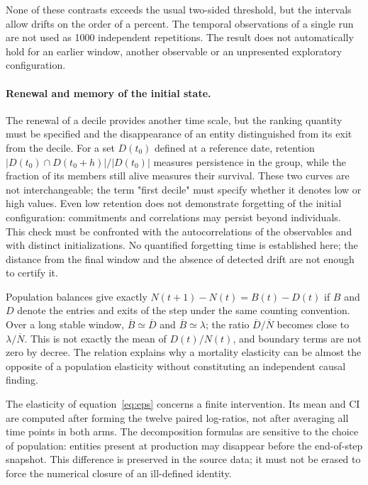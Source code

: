 

None of these contrasts exceeds the usual two-sided threshold, but the
intervals allow drifts on the order of a percent. The temporal observations
of a single run are not used as 1000 independent repetitions.
The result does not automatically hold for an earlier window,
another observable or an unpresented exploratory configuration.

\paragraph{Renewal and memory of the initial state.}
The renewal of a decile provides another time scale, but
the ranking quantity must be specified and the disappearance of an
entity distinguished from its exit from the decile. For a set $D(t_0)$
defined at a reference date, retention
$|D(t_0)\cap D(t_0+h)|/|D(t_0)|$ measures persistence in the group,
while the fraction of its members still alive measures their survival.
These two curves are not interchangeable; the term "first
decile" must specify whether it denotes low or high values.
Even low retention does not demonstrate forgetting of the
initial configuration: commitments and correlations may persist beyond
individuals. This check must be confronted with the autocorrelations of
the observables and with distinct initializations. No quantified
forgetting time is established here; the distance from the final window and
the absence of detected drift are not enough to certify it.

Population balances give exactly
$N(t+1)-N(t)=B(t)-D(t)$ if $B$ and $D$ denote the entries and exits
of the step under the same counting convention. Over a long stable window,
$\overline B\simeq\overline D$ and $\overline B\simeq\lambda$;
the ratio $\overline D/\overline N$ becomes close to
$\lambda/\overline N$. This is not exactly the mean of
$D(t)/N(t)$, and boundary terms are not zero by decree.
The relation explains why a mortality elasticity can be
almost the opposite of a population elasticity without constituting an
independent causal finding.

The elasticity of equation~\eqref{eq:eps} concerns a finite
intervention. Its mean and CI are computed after forming the twelve
paired log-ratios, not after averaging all time points
in both arms. The decomposition formulas are sensitive to the
choice of population: entities present at production may
disappear before the end-of-step snapshot. This difference is
preserved in the source data; it must not be erased to
force the numerical closure of an ill-defined identity.

